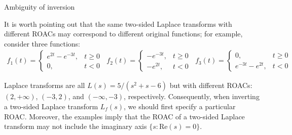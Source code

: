 \documentclass{beamer}
\begin{document}
\begin{frame}{Ambiguity of inversion}


    {\footnotesize \footnotesize
    It is worth pointing out that the same 
    two-sided Laplace transforms with different ROACs may correspond to different original functions; for example, consider three functions:
    \vspace{1em}
    \begin{align*}
        f_1(t) =
        \begin{cases} 
        e^{2t} - e^{-3t}, & t \geq 0\\
        0, & t < 0
        \end{cases}\;\;f_2(t) =
        \begin{cases} 
        -e^{-3t}, & t \geq 0\\
        -e^{2t}, & t < 0
        \end{cases}\;\;f_3(t) =
        \begin{cases} 
        0, & t \geq 0\\
        e^{-3t} - e^{2t}, & t < 0
        \end{cases}
    \end{align*}
    \vspace{1em}
    \par Laplace transforms are all \( L(s) = 5/(s^2 + s - 6) \) 
    but with different ROACs: \((2, +\infty)\), \((-3, 2)\), and \((-\infty, -3)\), respectively. 
    Consequently, when inverting a two-sided Laplace transform \( L_f(s) \), we should first specify a particular ROAC.  Moreover, the examples 
    imply that the ROAC of a two-sided Laplace transform may not include the imaginary axis \(\{s : \text{Re}(s) = 0\}\).
    \vspace{1em}
    }
    
\end{frame}
\end{document}
